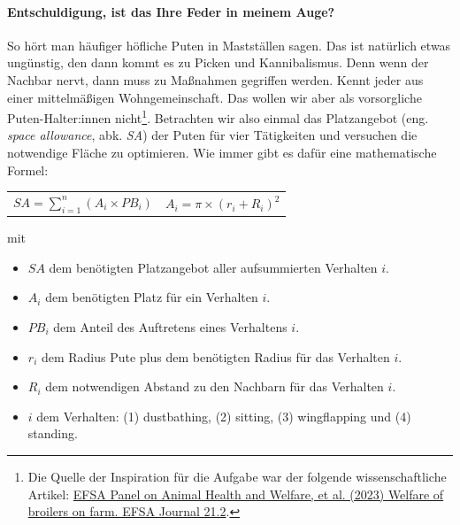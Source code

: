 \documentclass[a4paper, 9pt]{scrartcl}\usepackage[]{graphicx}\usepackage[]{xcolor}
\begin{document}
\paragraph{Entschuldigung, ist das Ihre Feder in meinem Auge?}



So h{\"o}rt man h{\"a}ufiger h{\"o}fliche Puten in Mastst{\"a}llen sagen. Das
ist nat{\"u}rlich etwas ung{\"u}nstig, den dann kommt es zu Picken und
Kannibalismus. Denn wenn der Nachbar nervt, dann muss zu Ma{\ss}nahmen
gegriffen werden. Kennt jeder aus einer mittelm{\"a}{\ss}igen Wohngemeinschaft. Das
wollen wir aber als vorsorgliche Puten-Halter:innen
nicht\footnote{Die Quelle der Inspiration f{\"u}r die Aufgabe war der folgende
  wissenschaftliche Artikel:
  \href{https://www.efsa.europa.eu/en/efsajournal/pub/7788}{EFSA Panel on
    Animal Health and Welfare, et al. (2023) Welfare of broilers on
    farm. EFSA Journal 21.2}.}. Betrachten wir also einmal das Platzangebot
(eng. \textit{space allowance}, abk. \textit{SA}) der Puten
f{\"u}r vier T{\"a}tigkeiten und versuchen die notwendige Fl{\"a}che zu optimieren. Wie
immer gibt es daf{\"u}r eine mathematische Formel:


\begin{center}
  \begin{tabular}{cc}
    $SA = \sum^n_{i = 1} (A_i \times PB_i)$ & $A_i = \pi \times (r_i + R_i)^2$\\
  \end{tabular}
\end{center}

\vspace{-2Ex}

mit

\begin{itemize}[noitemsep]
\item $SA$ dem ben{\"o}tigten Platzangebot aller aufsummierten Verhalten $i$.
\item $A_i$ dem ben{\"o}tigten Platz f{\"u}r ein Verhalten $i$. 
\item $PB_i$ dem Anteil des Auftretens eines Verhaltens $i$.
\item $r_i$ dem Radius Pute plus dem ben{\"o}tigten Radius f{\"u}r das Verhalten $i$.
\item $R_i$ dem notwendigen Abstand zu den Nachbarn f{\"u}r das Verhalten $i$.    
\item $i$ dem Verhalten: (1) dustbathing, (2) sitting, (3)
  wingflapping und (4) standing.
\end{itemize}
\end{document}
